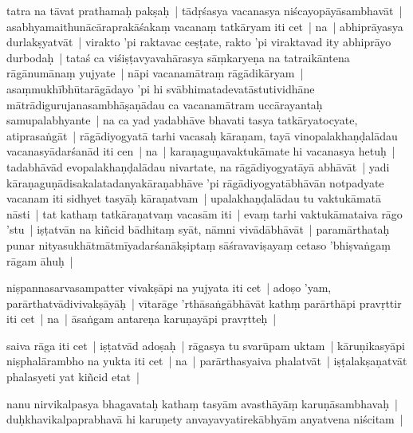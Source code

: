 \documentclass[article,12pt,a4paper]{memoir}%
\newcounter{parCount}
\begin{document}
	  
	  \pstart \leavevmode%
	\label{thakur75-26.13}tatra na tāvat prathamaḥ pakṣaḥ | tādṛśasya vacanasya niścayopāyāsambhavāt | asabhyamaithunācāraprakāśakaṃ vacanaṃ tatkāryam iti cet | na | abhiprāyasya durlakṣyatvāt | virakto 'pi raktavac ceṣṭate, rakto 'pi viraktavad ity abhiprāyo durbodaḥ | tataś ca viśiṣṭavyavahārasya sāṃkaryeṇa na tatraikāntena rāgānumānaṃ yujyate | nāpi vacanamātraṃ rāgādikāryam | asaṃmukhībhūtarāgādayo 'pi hi svābhimatadevatāstutividhāne mātrādigurujanasambhāṣaṇādau ca vacanamātram uccārayantaḥ samupalabhyante | na ca yad yadabhāve bhavati tasya tatkāryatocyate, atiprasaṅgāt | rāgādiyogyatā tarhi vacasaḥ kāraṇam, tayā vinopalakhaṇḍalādau vacanasyādarśanād iti cen | na | karaṇaguṇavaktukāmate hi vacanasya hetuḥ | tadabhāvād evopalakhaṇḍalādau nivartate, na rāgādiyogyatāyā abhāvāt | yadi kāraṇaguṇādisakalatadanyakāraṇabhāve 'pi rāgādiyogyatābhāvān notpadyate vacanam iti sidhyet tasyāḥ kāraṇatvam | upalakhaṇḍalādau tu vaktukāmatā nāsti | tat kathaṃ tatkāraṇatvaṃ vacasām iti | evaṃ tarhi vaktukāmataiva rāgo 'stu | iṣṭatvān na kiñcid bādhitaṃ syāt, nāmni vivādābhāvāt | paramārthataḥ punar nityasukhātmātmīyadarśanākṣiptaṃ sāśravaviṣayaṃ cetaso 'bhiṣvaṅgaṃ rāgam āhuḥ | 
	{}
	\pend%
      

	  
	  \pstart \leavevmode%
	\label{thakur75-26.28}niṣpannasarvasampatter vivakṣāpi na yujyata iti cet | adoṣo 'yam, parārthatvādivivakṣāyāḥ | vītarāge 'rthāsaṅgābhāvāt kathṃ parārthāpi pravṛttir iti cet | na | āsaṅgam antareṇa karuṇayāpi pravṛtteḥ | 
	{}
	\pend%
      

	  
	  \pstart \leavevmode%
	saiva rāga iti cet | iṣṭatvād adoṣaḥ | rāgasya tu svarūpam uktam | kāruṇikasyāpi niṣphalārambho na yukta iti cet | na | parārthasyaiva phalatvāt | iṣṭalakṣaṇatvāt phalasyeti yat kiñcid etat | 
	{}
	\pend%
      

	  
	  \pstart \leavevmode%
	\label{thakur75-27.1}nanu nirvikalpasya bhagavataḥ kathaṃ tasyām avasthāyāṃ karuṇāsambhavaḥ | duḥkhavikalpaprabhavā hi karuṇety anvayavyatirekābhyām anyatvena niścitam | 
	{}
	\pend%
      
\end{document}
